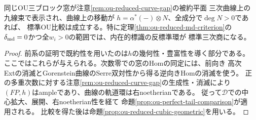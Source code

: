 \begin{corollary}[正の多重次数を持つ曲線表示での比較]
\label{cor:ou-positive-automatic-comparison}
同じOU三ブロック窓が注意\ref{rem:ou-reduced-curve-gap}の被約平面
三次曲線上の九線束で表示され、曲線上の移動が
$h=\alpha^*(-)\otimes N$、全成分で$\deg N>0$であれば、
標準OU比較は成立する。特に定理\ref{thm:ou-reduced-md-criterion}の
$\delta_{\rm md}=0$かつ全$w_i>0$の範囲では、内在的標識の反標準環が
標準三次商になる。
\end{corollary}
\begin{proof}
前系の証明で既約性を用いたのは$h$の幾何性・豊富性を導く部分である。
ここではこれらが与えられる。次数零での窓のHomの同定には、前向き
高次Extの消滅とGorenstein曲線のSerre双対性から得る逆向きHomの消滅を使う。
正の多重次数に対する注意\ref{rem:ou-reduced-curve-gap}の生成性・消滅により
$(FP,h)$はampleであり、曲線の軌道環は右noetherianである。
従って$\mathcal D$での中心拡大、展開、右noetherian性を経て
命題\ref{prop:ou-perfect-tail-comparison}が適用される。
比較を得た後は命題\ref{prop:ou-reduced-cubic-geometric}を用いる。
\end{proof}

